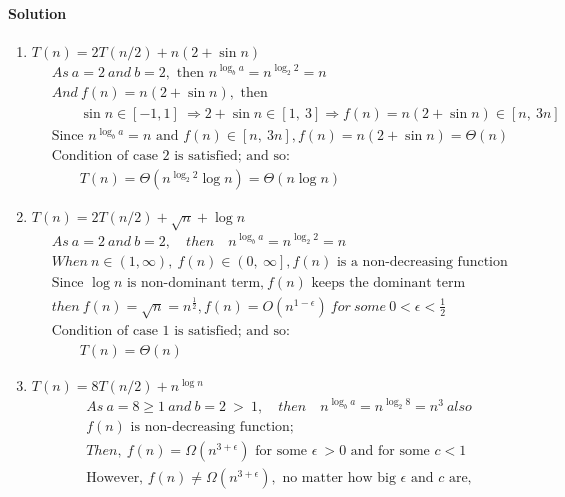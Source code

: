 \documentclass[a4paper]{scrartcl}
\begin{document}
\paragraph{Solution}
\begin{enumerate}[label=(\alph*)]
  \item $T (n) = 2T (n/2) + n(2 + \sin{n})$
\begin{align*}
  &\ As\ a = 2\ and\ b = 2,\text{ then }n^{\log_b{a}} = n^{\log_2{2}} = n\\
  &\ And\ f(n) = n(2 + \sin{n}),\text{ then}\\ &\
  \qquad \sin{n} \in \left[-1, 1\right]\ \Rightarrow 2+\sin{n} \in \left[1,\ 3\right] \Rightarrow f(n) = n\left(2 + \sin{n}\right) \in \left[n,\ 3n\right]\\ &\
  \text{Since }n^{\log_b{a}} = n\text{ and }f(n) \in \left[n,\ 3n\right], f(n) = n(2 + \sin{n}) = \Theta(n)\\ &\
  \text{Condition of case 2 is satisfied; and so:}\\
  &\ \qquad T(n)=\Theta\left({n^{\log_2{2}}\log{n}}\right) =\Theta\left({n\log{n}}\right)
\end{align*}
\item $T (n) = 2T (n/2) + \sqrt{n} + \log{n}$
\begin{align*}
  &\ As\ a = 2\ and\ b = 2,\quad then \quad n^{\log_b{a}} = n^{\log_2{2}} = n\\
  &\ When\ n \in \left(1, \infty\right),\ f(n) \in \left(0,\ \infty\right], f(n)\text{ is a non-decreasing function}\\
  &\ \text{Since }\log{n}\text{ is non-dominant term,}\ f(n)\text{ keeps the dominant term}\\ &\
  then\ f(n) = \sqrt{n}=n^{\frac{1}{2}}, f(n)=O(n^{1-\epsilon})\ for\ some\ 0< \epsilon < \frac{1}{2}\\ &\
  \text{Condition of case 1 is satisfied; and so:}\\
  &\ \qquad T(n)=\Theta(n)
\end{align*}
\item $T (n) = 8T (n/2) + n^{\log{n}}$
\begin{align*}
  &\ As\ a = 8\geq 1\ and\ b = 2\ >\ 1,\quad then \quad n^{\log_b{a}} = n^{\log_2{8}} = n^3\ also\\ &\
   f(n)\text{ is non-decreasing function;}\\ &\
   Then,\ f(n)=\Omega(n^{3+\epsilon})\text{ for some }\epsilon\ >0\text{ and for some }c < 1\\ &\
   \text{However, }f(n) \neq \Omega(n^{3+\epsilon}),\text{ no matter how big }\epsilon\text{ and }c\text{ are,}\\ &\

\end{align*}
\end{enumerate}
\end{document}
